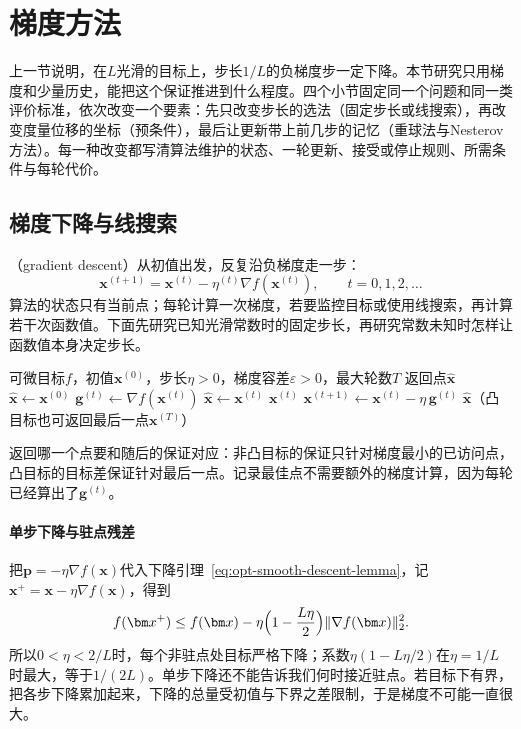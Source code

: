 \section{梯度方法}
\label{sec:opt-smooth-gradient-methods}

上一节说明，在$L$光滑的目标上，步长$1/L$的负梯度步一定下降。本节研究只用梯度和少量历史，能把这个保证推进到什么程度。四个小节固定同一个问题和同一类评价标准，依次改变一个要素：先只改变步长的选法（固定步长或线搜索），再改变度量位移的坐标（预条件），最后让更新带上前几步的记忆（重球法与Nesterov方法）。每一种改变都写清算法维护的状态、一轮更新、接受或停止规则、所需条件与每轮代价。

\subsection{梯度下降与线搜索}
\label{sec:opt-smooth-gd-linesearch}

（gradient descent）从初值出发，反复沿负梯度走一步：
\begin{equation}
\label{eq:opt-smooth-gd}
  \bm x^{(t+1)}=\bm x^{(t)}-\eta^{(t)}\nabla f(\bm x^{(t)}),\qquad t=0,1,2,\dots
\end{equation}
算法的状态只有当前点；每轮计算一次梯度，若要监控目标或使用线搜索，再计算若干次函数值。下面先研究已知光滑常数时的固定步长，再研究常数未知时怎样让函数值本身决定步长。

\begin{algorithm}[固定步长梯度下降]
\label{alg:opt-smooth-gd}
\begin{algorithmic}[1]
\Require 可微目标$f$，初值$\bm x^{(0)}$，步长$\eta>0$，梯度容差$\varepsilon>0$，最大轮数$T$
\Ensure 返回点$\hat{\bm x}$
\State $\hat{\bm x}\gets\bm x^{(0)}$
  \State $\bm g^{(t)}\gets\nabla f(\bm x^{(t)})$
   \State $\hat{\bm x}\gets\bm x^{(t)}$ \EndIf
   \State \Return $\bm x^{(t)}$ \EndIf
  \State $\bm x^{(t+1)}\gets\bm x^{(t)}-\eta\,\bm g^{(t)}$
\EndFor
\State \Return $\hat{\bm x}$（凸目标也可返回最后一点$\bm x^{(T)}$）
\end{algorithmic}
\end{algorithm}

返回哪一个点要和随后的保证对应：非凸目标的保证只针对梯度最小的已访问点，凸目标的目标差保证针对最后一点。记录最佳点不需要额外的梯度计算，因为每轮已经算出了$\bm g^{(t)}$。

\paragraph{单步下降与驻点残差}
把$\bm p=-\eta\nabla f(\bm x)$代入下降引理~\eqref{eq:opt-smooth-descent-lemma}，记$\bm x^+=\bm x-\eta\nabla f(\bm x)$，得到
\begin{equation}
\label{eq:opt-smooth-gd-one-step}
  f(\bm x^+)\leq f(\bm x)-\eta\Bigl(1-\frac{L\eta}{2}\Bigr)\lVert\nabla f(\bm x)\rVert_2^2 .
\end{equation}
所以$0<\eta<2/L$时，每个非驻点处目标严格下降；系数$\eta(1-L\eta/2)$在$\eta=1/L$时最大，等于$1/(2L)$。单步下降还不能告诉我们何时接近驻点。若目标下有界，把各步下降累加起来，下降的总量受初值与下界之差限制，于是梯度不可能一直很大。

